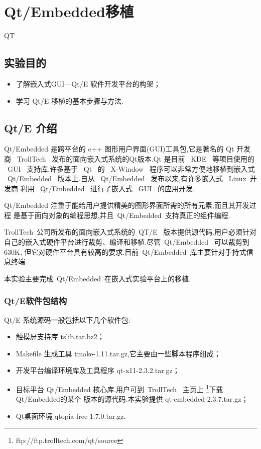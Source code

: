 \chapter{Qt/Embedded移植}{QT}

\section{实验目的}
\begin{itemize}\itemsep=-3pt
  \item 了解嵌入式GUI---Qt/E 软件开发平台的构架；
  \item 学习 Qt/E 移植的基本步骤与方法.
\end{itemize}

\section{Qt/E 介绍}
	Qt/Embedded 是跨平台的 c++ 图形用户界面(GUI)工具包,它是著名的 Qt 开发商
~TrollTech~ 发布的面向嵌入式系统的Qt版本.Qt 是目前 ~KDE~ 等项目使用的 ~GUI~
支持库,许多基于 ~Qt~ 的 ~X-Window~ 程序可以非常方便地移植到嵌入式
~Qt/Embedded~ 版本上.自从 ~Qt/Embedded~ 发布以来,有许多嵌入式 ~Linux~开发商
利用 ~Qt/Embedded~ 进行了嵌入式 ~GUI~ 的应用开发.

	Qt/Embedded 注重于能给用户提供精美的图形界面所需的所有元素,而且其开发过程
是基于面向对象的编程思想,并且~Qt/Embedded~支持真正的组件编程.

	TrollTech~公司所发布的面向嵌入式系统的~QT/E~ 版本提供源代码.用户必须针对
自己的嵌入式硬件平台进行裁剪、编译和移植.尽管~Qt/Embedded~ 可以裁剪到630K,
但它对硬件平台具有较高的要求.目前~Qt/Embedded~库主要针对手持式信息终端.

	本实验主要完成~Qt/Embedded~在嵌入式实验平台上的移植.
\subsection{Qt/E软件包结构}
	Qt/E 系统源码一般包括以下几个软件包:
\begin{itemize}\itemsep=-3pt
  \item 触摸屏支持库 tslib.tar.bz2；
  \item Makefile 生成工具 tmake-1.11.tar.gz,它主要由一些脚本程序组成；
  \item 开发平台编译环境库及工具程序 qt-x11-2.3.2.tar.gz；
  \item 目标平台 Qt/Embedded 核心库.用户可到~TrollTech~ 主页上
		\footnote{ftp://ftp.trolltech.com/qt/source}下载Qt/Embedded的某个
		版本的源代码.本实验提供 qt-embedded-2.3.7.tar.gz；
  \item Qt桌面环境 qtopia-free-1.7.0.tar.gz.
\end{itemize}

